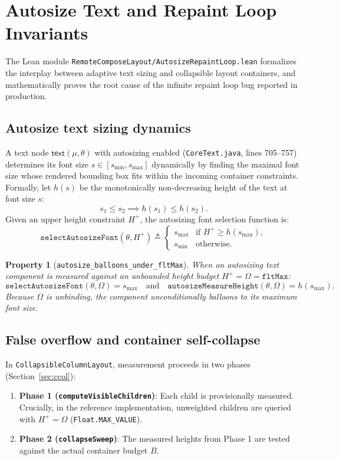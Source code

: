\documentclass[11pt,a4paper]{article}
\newcommand{\Om}{\Omega}
\newcommand{\ttext}{\mathsf{text}}
\newcommand{\lo}[1]{\texttt{#1}}       %
\newcommand{\jv}[1]{\texttt{#1}}       %
\newcommand{\file}[1]{\texttt{#1}}
\theoremstyle{definition}
\theoremstyle{plain}
\newtheorem{property}{Property}[section]
\theoremstyle{remark}
\begin{document}
\section{Autosize Text and Repaint Loop Invariants}
\label{sec:autosize-loop}

The Lean module \file{RemoteComposeLayout/AutosizeRepaintLoop.lean} formalizes
the interplay between adaptive text sizing and collapsible layout containers,
and mathematically proves the root cause of the infinite repaint loop bug reported
in production.

\subsection{Autosize text sizing dynamics}
\label{sec:autosize-dynamics}

A text node $\ttext(\mu, \theta)$ with autosizing enabled (\jv{CoreText.java}, lines 705--757)
determines its font size $s \in [s_{\min}, s_{\max}]$ dynamically by finding the maximal
font size whose rendered bounding box fits within the incoming container constraints.
Formally, let $h(s)$ be the monotonically non-decreasing height of the text at font size $s$:
\[
  s_1 \le s_2 \implies h(s_1) \le h(s_2).
\]
Given an upper height constraint $H^+$, the autosizing font selection function is:
\[
  \lo{selectAutosizeFont}(\theta, H^+) \triangleq \begin{cases}
    s_{\max} & \text{if } H^+ \ge h(s_{\max}), \\
    s_{\min} & \text{otherwise.}
  \end{cases}
\]

\begin{property}[\lo{autosize\_balloons\_under\_fltMax}]
When an autosizing text component is measured against an unbounded height budget $H^+ = \Om = \lo{fltMax}$:
\[
  \lo{selectAutosizeFont}(\theta, \Om) = s_{\max} \quad\text{and}\quad
  \lo{autosizeMeasureHeight}(\theta, \Om) = h(s_{\max}).
\]
Because $\Om$ is unbinding, the component unconditionally balloons to its maximum font size.
\end{property}

\subsection{False overflow and container self-collapse}
\label{sec:autosize-collapse}

In \jv{CollapsibleColumnLayout}, measurement proceeds in two phases (Section~\ref{sec:ccol}):
\begin{enumerate}
  \item \textbf{Phase 1 (\jv{computeVisibleChildren})}: Each child is provisionally measured.
    Crucially, in the reference implementation, unweighted children are queried with
    $H^+ = \Om$ (\jv{Float.MAX\_VALUE}).
  \item \textbf{Phase 2 (\jv{collapseSweep})}: The measured heights from Phase 1 are tested
    against the actual container budget $B$.
\end{enumerate}
\end{document}

